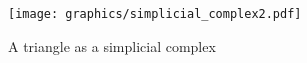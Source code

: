 
\begin{figure}[h]
\centering
\texttt{[image: graphics/simplicial\_complex2.pdf]}
\caption{A triangle as a simplicial complex}
\label{fig:triangle_simplicial_complex}
\end{figure}





